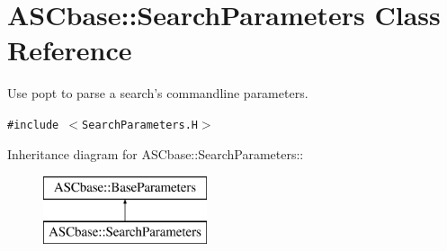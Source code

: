 \section{ASCbase::Search\-Parameters Class Reference}
\label{classASCbase_1_1SearchParameters}
Use popt to parse a search's commandline parameters.  


{\tt \#include $<$Search\-Parameters.H$>$}

Inheritance diagram for ASCbase::Search\-Parameters::\begin{figure}[H]
\begin{center}
\leavevmode
\includegraphics[height=2cm]{classASCbase_1_1SearchParameters}
\end{center}
\end{figure}
